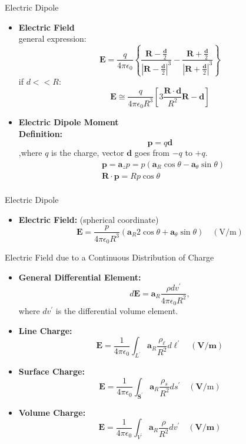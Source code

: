 \documentclass[xcolor={dvipsnames}]{beamer}
\begin{document}
\begin{frame}{Electric Dipole}
\begin{itemize}
\item \textbf{Electric Field}\\
general expression:
\begin{equation*}
\mathbf{E}=\frac{q}{4 \pi \epsilon_{0}}\left\{\frac{\mathbf{R}-\frac{\mathbf{d}}{2}}{\left|\mathbf{R}-\frac{\mathbf{d}}{2}\right|^{3}}-\frac{\mathbf{R}+\frac{\mathbf{d}}{2}}{\left|\mathbf{R}+\frac{\mathbf{d}}{2}\right|^{3}}\right\}
\end{equation*}
if $d<<R$:
\[
\mathbf{E} \cong \frac{q}{4 \pi \epsilon_{0} R^{3}}\left[3 \frac{\mathbf{R} \cdot \mathbf{d}}{R^{2}} \mathbf{R}-\mathbf{d}\right]
\]

\item \textbf{Electric Dipole Moment}\\
\textbf{Definition:} 
\[
\mathbf{p}=q \mathbf{d}
\]
,where $q$ is the charge, vector $\mathbf{d}$ goes from $-q$ to $+q$.
\[
\begin{aligned}
&\mathbf{p}=\mathbf{a}_{z} p=p\left(\mathbf{a}_{R} \cos \theta-\mathbf{a}_{\theta} \sin \theta\right)\\
&\mathbf{R} \cdot \mathbf{p}=R p \cos \theta\\
\end{aligned}
\]
\end{itemize}
\end{frame}
\begin{frame}{Electric Dipole}
\begin{itemize}
\item \textbf{Electric Field:} (spherical coordinate)
\[
\mathbf{E}=\frac{p}{4 \pi \epsilon_{0}R^{3}}\left(\mathbf{a}_{R} 2 \cos \theta+\mathbf{a}_{\theta} \sin \theta\right) \quad(\mathrm{V} / \mathrm{m})
\]
\end{itemize}
\end{frame}
\begin{frame}{Electric Field due to a Continuous Distribution of Charge}
\begin{itemize}
\item \textbf{General Differential Element:}
\[
d \mathbf{E}=\mathbf{a}_{R} \frac{\rho d v^{\prime}}{4 \pi \epsilon_{0} R^{2}},
\]
where $dv^\prime$ is the differential volume element.  

\item \textbf{Line Charge:}
\[
\mathbf{E}=\frac{1}{4 \pi \epsilon_{0}} \int_{L^{\prime}} \mathbf{a}_{R} \frac{\rho_{\ell}}{R^{2}} d \ell^{\prime} \quad(\mathbf{V} / \mathbf{m})
\]
\item \textbf{Surface Charge:}
\[
\mathbf{E}=\frac{1}{4 \pi \epsilon_{0}} \int_{\mathbf{S}^{\prime}} \mathbf{a}_{R} \frac{\rho_{s}}{R^{2}} d s^{\prime} \quad(\mathbf{V} / \mathrm{m})
\]
\item \textbf{Volume Charge:}
\[
\mathbf{E}=\frac{1}{4 \pi \epsilon_{0}} \int_{V^{\prime}} \mathbf{a}_{R} \frac{\rho}{R^{2}} d v^{\prime} \quad(\mathbf{V} / \mathbf{m})
\]
\end{itemize}
\end{frame}
\end{document}
